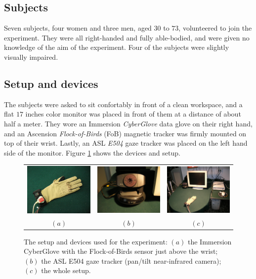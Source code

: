 \subsection{Subjects}

Seven subjects, four women and three men, aged $30$ to $73$,
volunteered to join the experiment. They were all right-handed and
fully able-bodied, and were given no knowledge of the aim of the
experiment. Four of the subjects were slightly visually
impaired.

\subsection{Setup and devices}

The subjects were asked to sit confortably in front of a clean
workspace, and a flat $17$ inches color monitor was placed in front of
them at a distance of about half a meter. They wore an Immersion
\emph{CyberGlove} data glove \cite{cyberglove} on their right hand,
and an Ascension \emph{Flock-of-Birds} (FoB) \cite{fob} magnetic
tracker was firmly mounted on top of their wrist. Lastly, an ASL
\emph{E504} gaze tracker \cite{e504} was placed on the left hand side
of the monitor. Figure \ref{fig:devices} shows the devices and setup.

\begin{figure}[ht]
  \centering
    \begin{tabular}{ccc}
      \includegraphics[width=0.295\linewidth]{figs/glove.eps} &
      \includegraphics[width=0.295\linewidth]{figs/e504.eps} &
      \includegraphics[width=0.295\linewidth]{figs/setup.eps} \\
      $(a)$ & $(b)$ & $(c)$
    \end{tabular}
    \caption{The setup and devices used for the experiment: $(a)$ the
    Immersion CyberGlove with the Flock-of-Birds sensor just above the
    wrist; $(b)$ the ASL E504 gaze tracker (pan/tilt near-infrared
    camera); $(c)$ the whole setup.}
    \label{fig:devices}
\end{figure}

